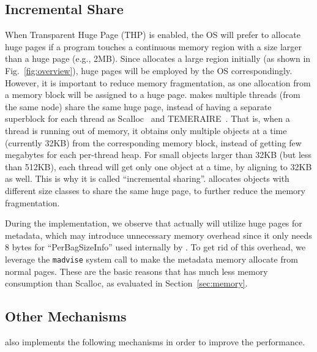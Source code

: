 \subsection{Incremental Share}
\label{sec:hugepages}
When Transparent Huge Page (THP) is enabled, the OS will prefer to allocate huge pages if a program touches a continuous memory region with a size larger than a huge page (e.g., 2MB). Since \NM{} allocates a large region initially (as shown in Fig.~\ref{fig:overview}), huge pages will be employed by the OS correspondingly. However, it is important to reduce memory fragmentation, as one allocation from a memory block will be assigned to a huge page.
\NM{} makes multiple threads (from the same node) share the same huge page, instead of having a separate superblock for each thread as Scalloc~\cite{Scalloc} and TEMERAIRE~\cite{TEMERAIRE}. That is, when a thread is running out of memory, it obtains only multiple objects at a time (currently 32KB) from the corresponding memory block, instead of getting few megabytes for each per-thread heap. For small objects larger than 32KB (but less than 512KB), each thread will get only one object at a time, by aligning to 32KB as well.  This is why it is called ``incremental sharing''. 
\NM{} allocates objects with different size classes to share the same huge page, to further reduce the memory fragmentation. 

During the implementation, we observe that \NM{} actually will utilize huge pages for metadata, which may introduce unnecessary memory overhead since it only needs 8 bytes for ``PerBagSizeInfo'' used internally by \NM{}. To get rid of this overhead, we leverage the \texttt{madvise} system call to make the metadata memory allocate from normal pages. These are the basic reasons that \NM{} has much less memory consumption than Scalloc, as evaluated in Section~\ref{sec:memory}. 

\subsection{Other Mechanisms}
\label{sec:others}

\NM{} also implements the following mechanisms in order to improve the performance.



